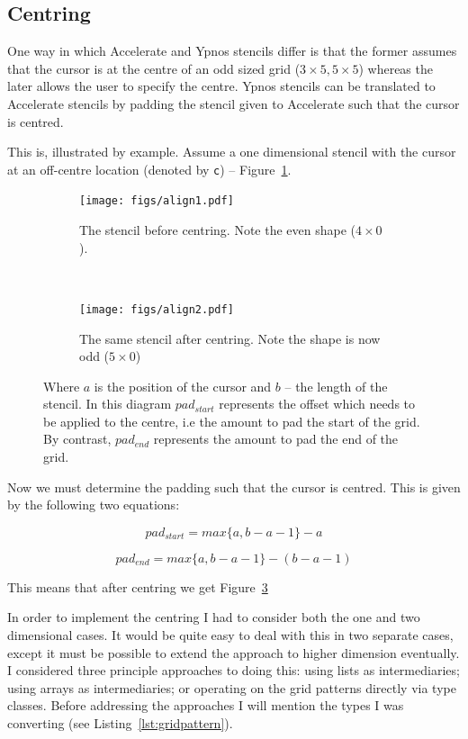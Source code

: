 \documentclass[
    12pt,
    a4paper,
    twoside,
    openright,
    ]{scrbook}
\begin{document}
\subsection{Centring}
\label{sec:centring}

One way in which Accelerate and Ypnos stencils differ is that the former assumes
that the cursor is at the centre of an odd sized grid ($3 \times 5, 5 \times 5$)
whereas the later allows the user to specify the centre. Ypnos stencils can be
translated to Accelerate stencils by padding the stencil given to Accelerate
such that the cursor is centred.

This is, illustrated by example. Assume a one dimensional stencil with the
cursor at an off-centre location (denoted by \texttt{c}) --
Figure~\ref{fig:cursor}.

\begin{figure}
  \centering
  \begin{subfigure}[t]{0.45\textwidth}
    \texttt{[image: figs/align1.pdf]}
    \caption{The stencil before centring. Note the even shape ($4\times0$).}
    \label{fig:cursor}
  \end{subfigure}
  ~
  \begin{subfigure}[t]{0.45\textwidth}
    \texttt{[image: figs/align2.pdf]}
    \caption{The same stencil after centring. Note the shape is now odd
      ($5\times0$)}
    \label{fig:centredcursor}
  \end{subfigure}
  \caption{Where $a$ is the position of the cursor and $b$ -- the length of the
    stencil.  In this diagram $pad_{start}$ represents the offset which needs to
    be applied to the centre, i.e the amount to pad the start of the grid. By
    contrast, $pad_{end}$ represents the amount to pad the end of the grid. }
\end{figure}

Now we must determine the padding such that the cursor is centred. This is given
by the following two equations:

\[ pad_{start} = max \{a, b-a-1\} - a \]

\[ pad_{end} = max \{a, b-a-1\} - (b - a - 1) \]

This means that after centring we get Figure~\ref{fig:centredcursor}

In order to implement the centring I had to consider both the one and two
dimensional cases.  It would be quite easy to deal with this in two separate
cases, except it must be possible to extend the approach to higher dimension
eventually. I considered three principle approaches to doing this: using lists
as intermediaries; using arrays as intermediaries; or operating on the grid
patterns directly via type classes.  Before addressing the approaches I will
mention the types I was converting (see Listing~\ref{lst:gridpattern}).
\end{document}
